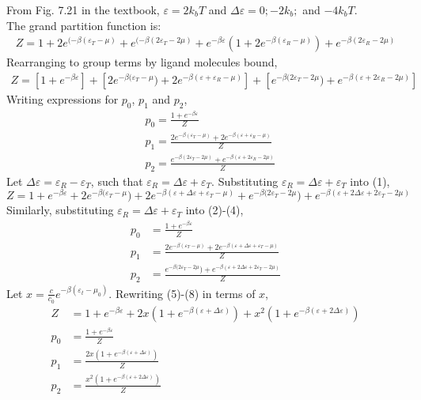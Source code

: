 From Fig. 7.21 in the textbook, $\varepsilon=2k_{b}T$ and $\Delta\varepsilon=0;-2k_{b};$ and $-4k_{b}T.$\\
The grand partition function is:
\begin{align*}
Z=1+2e^{(-\beta(\varepsilon_{T}-\mu)}+e^{(-\beta(2\varepsilon_{T}-2\mu)}
+e^{-\beta\varepsilon}(1+2e^{-\beta(\varepsilon_{R}-\mu)})+e^{-\beta(2\varepsilon_{R}-2\mu)}
\end{align*}
Rearranging to group terms by ligand molecules bound,
\begin{align}
Z =[1+e^{-\beta\varepsilon}]
+[2e^{-\beta(\varepsilon_{T}-\mu})+2e^{-\beta(\varepsilon+\varepsilon_{R}-\mu)}]
+[e^{-\beta(2\varepsilon_{T}-2\mu})+e^{-\beta(\varepsilon+2\varepsilon_{R}-2\mu)}]
\end{align}
Writing expressions for $p_{0}$, $p_{1}$ and $p_{2}$,
\begin{align}
&   p_{0}=\frac{1+e^{-\beta\varepsilon}}{Z}\\
&   p_{1}=\frac{2e^{-\beta(\varepsilon_{T}-\mu)}+2e^{-\beta(\varepsilon+\varepsilon_{R}-\mu)}}{Z}\\
&   p_{2}=\frac{e^{-\beta(2\varepsilon_{T}-2\mu)}+e^{-\beta(\varepsilon+2\varepsilon_{R}-2\mu)}}{Z}
\end{align}
Let $\Delta\varepsilon=\varepsilon_{R}-\varepsilon_{T}$, such that $\varepsilon_{R}=\Delta\varepsilon+\varepsilon_{T}$.
Substituting $\varepsilon_{R}=\Delta\varepsilon+\varepsilon_{T}$ into (1),
\begin{equation}
    Z=1+e^{-\beta\varepsilon}
    +2e^{-\beta(\varepsilon_{T}-\mu})+2e^{-\beta(\varepsilon+\Delta\varepsilon+\varepsilon_{T}-\mu)}
    +e^{-\beta(2\varepsilon_{T}-2\mu})+e^{-\beta(\varepsilon+2\Delta\varepsilon+2\varepsilon_{T}-2\mu)}
\end{equation}
Similarly, substituting $\varepsilon_{R}=\Delta\varepsilon+\varepsilon_{T}$ into (2)-(4),
\begin{align}
    p_{0}&=\frac{1+e^{-\beta\varepsilon}}{Z}\\
    p_{1}&=\frac{2e^{-\beta(\varepsilon_{T}-\mu)}+2e^{-\beta(\varepsilon+\Delta\varepsilon+\varepsilon_{T}-\mu)}}
    {Z}\\
    p_{2}&=\frac{e^{-\beta(2\varepsilon_{T}-2\mu})+e^{-\beta(\varepsilon+2\Delta\varepsilon+2\varepsilon_{T}-2\mu)}}{Z}
\end{align}
Let $x =\frac{c}{c_{0}}e^{-\beta(\varepsilon_{t}-\mu_{0})}$. Rewriting (5)-(8) in terms of $x$,
\begin{align}
    Z&=1+e^{-\beta\varepsilon}
    +2x(1+e^{-\beta(\varepsilon+\Delta\varepsilon)})
    +x^{2}(1+e^{-\beta(\varepsilon+2\Delta\varepsilon)})\\
    p_{0}&=\frac{1+e^{-\beta\varepsilon}}{Z}\\
    p_{1}&=\frac{2x(1+e^{-\beta(\varepsilon+\Delta\varepsilon)})}{Z}\\
    p_{2}&=\frac{x^{2}(1+e^{-\beta(\varepsilon+2\Delta\varepsilon)})}{Z}
\end{align}
